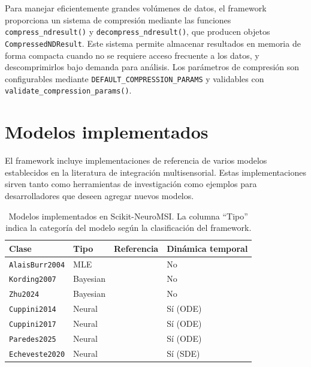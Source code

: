 Para manejar eficientemente grandes volúmenes de datos, el framework proporciona un sistema de compresión mediante las funciones \texttt{compress\_ndresult()} y \texttt{decompress\_ndresult()}, que producen objetos \texttt{CompressedNDResult}. Este sistema permite almacenar resultados en memoria de forma compacta cuando no se requiere acceso frecuente a los datos, y descomprimirlos bajo demanda para análisis. Los parámetros de compresión son configurables mediante \texttt{DEFAULT\_COMPRESSION\_PARAMS} y validables con \texttt{validate\_compression\_params()}.


\section{Modelos implementados}
\label{sec:snmsi_modelos}

El framework incluye implementaciones de referencia de varios modelos establecidos en la literatura de integración multisensorial. Estas implementaciones sirven tanto como herramientas de investigación como ejemplos para desarrolladores que deseen agregar nuevos modelos.

\begin{table}[H]
\centering
\caption{Modelos implementados en Scikit-NeuroMSI. La columna ``Tipo'' indica la categoría del modelo según la clasificación del framework.}
\label{tab:modelos_sknmsi}
\begin{tabular}{llll}
\hline
\textbf{Clase} & \textbf{Tipo} & \textbf{Referencia} & \textbf{Dinámica temporal} \\
\hline
\texttt{AlaisBurr2004} & MLE & \citet{alais2004ventriloquist} & No \\
\texttt{Kording2007} & Bayesian & \citet{kording2007causal} & No \\
\texttt{Zhu2024} & Bayesian & \citet{zhu2024bci} & No \\
\texttt{Cuppini2014} & Neural & \citet{cuppini2014neural} & Sí (ODE) \\
\texttt{Cuppini2017} & Neural & \citet{cuppini2017biologically} & Sí (ODE) \\
\texttt{Paredes2025} & Neural & \citet{paredes2025scikit} & Sí (ODE) \\
\texttt{Echeveste2020} & Neural & \citet{echeveste2020cortical} & Sí (SDE) \\
\hline
\end{tabular}
\end{table}

